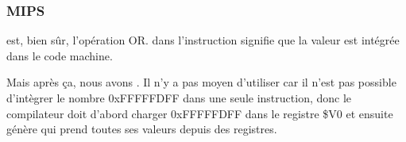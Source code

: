 ﻿\subsubsection{MIPS}




 est, bien sûr, l'opération OR.  dans l'instruction signifie que la
valeur est intégrée dans le code machine.


Mais après ça, nous avons \AND. Il n'y a pas moyen d'utiliser  car il n'est
pas possible d'intègrer le nombre 0xFFFFFDFF dans une seule instruction, donc le
compilateur doit d'abord charger 0xFFFFFDFF dans le registre \$V0 et ensuite génère
\AND qui prend toutes ses valeurs depuis des registres.
